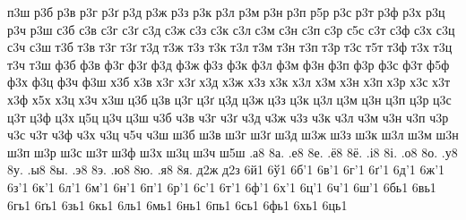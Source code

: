 {п3ш
р3б
р3в
р3г
р3ґ
р3д
р3ж
р3з
р3к
р3л
р3м
р3н
р3п
р5р
р3с
р3т
р3ф
р3х
р3ц
р3ч
р3ш
с3б
с3в
с3г
с3ґ
с3д
с3ж
с3з
с3к
с3л
с3м
с3н
с3п
с3р
с5с
с3т
с3ф
с3х
с3ц
с3ч
с3ш
т3б
т3в
т3г
т3ґ
т3д
т3ж
т3з
т3к
т3л
т3м
т3н
т3п
т3р
т3с
т5т
т3ф
т3х
т3ц
т3ч
т3ш
ф3б
ф3в
ф3г
ф3ґ
ф3д
ф3ж
ф3з
ф3к
ф3л
ф3м
ф3н
ф3п
ф3р
ф3с
ф3т
ф5ф
ф3х
ф3ц
ф3ч
ф3ш
х3б
х3в
х3г
х3ґ
х3д
х3ж
х3з
х3к
х3л
х3м
х3н
х3п
х3р
х3с
х3т
х3ф
х5х
х3ц
х3ч
х3ш
ц3б
ц3в
ц3г
ц3ґ
ц3д
ц3ж
ц3з
ц3к
ц3л
ц3м
ц3н
ц3п
ц3р
ц3с
ц3т
ц3ф
ц3х
ц5ц
ц3ч
ц3ш
ч3б
ч3в
ч3г
ч3ґ
ч3д
ч3ж
ч3з
ч3к
ч3л
ч3м
ч3н
ч3п
ч3р
ч3с
ч3т
ч3ф
ч3х
ч3ц
ч5ч
ч3ш
ш3б
ш3в
ш3г
ш3ґ
ш3д
ш3ж
ш3з
ш3к
ш3л
ш3м
ш3н
ш3п
ш3р
ш3с
ш3т
ш3ф
ш3х
ш3ц
ш3ч
ш5ш
%
%
%
.а8 8а.
.е8 8е.
.ё8 8ё.
.і8 8і.
.о8 8о.
.у8 8у.
.ы8 8ы.
.э8 8э.
.ю8 8ю.
.я8 8я.
%
%
%
%
%
д2ж
д2з
%
%
%
6й1
6ў1
%
%
%
6б'1
6в'1
6г'1
6ґ'1
6д'1
6ж'1
6з'1
6к'1
6л'1
6м'1
6н'1
6п'1
6р'1
6с'1
6т'1
6ф'1
6х'1
6ц'1
6ч'1
6ш'1
6бь1
6вь1
6гь1
6ґь1
6зь1
6кь1
6ль1
6мь1
6нь1
6пь1
6сь1
6фь1
6хь1
6ць1
%
}
